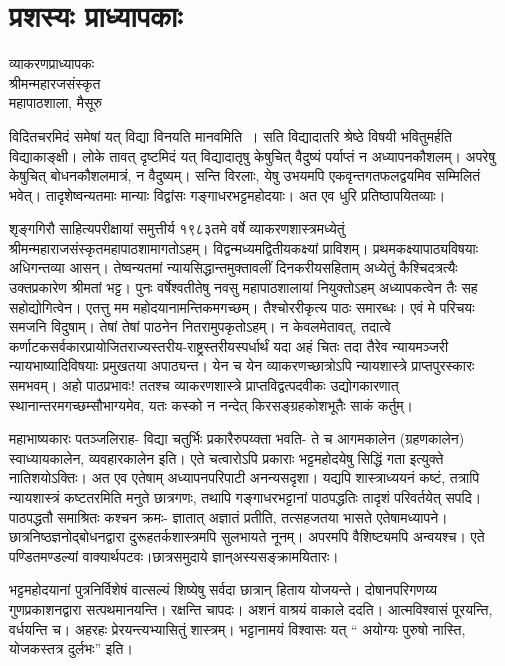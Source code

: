 \chapter{प्रशस्यः प्राध्यापकाः}

\begin{center}
\smallskip
व्याकरणप्राध्यापकः\\
श्रीमन्महारजसंस्कृत\\
महापाठशाला, मैसूरु
\addrule
\end{center}
विदितचरमिदं समेषां यत् विद्या विनयति मानवमिति~। सति विद्यादातरि श्रेष्ठे विषयी भवितुमर्हति विद्याकाङ्क्षी।  लोके तावत् दृष्टमिदं यत् विद्यादातृषु केषुचित् वैदुष्यं पर्याप्तं न अध्यापनकौशलम्। अपरेषु केषुचित् बोधनकौशलमात्रं, न वैदुष्यम्। सन्ति विरलाः, येषु उभयमपि एकवृन्तगतफलद्वयमिव सम्मिलितं भवेत्। तादृशेष्वन्यतमाः मान्याः विद्वांसः गङ्गाधरभट्टमहोदयाः। अत एव धुरि प्रतिष्ठापयितव्याः।

शृङ्गगिरौ साहित्यपरीक्षायां समुत्तीर्य १९८३तमे वर्षे व्याकरणशास्त्रमध्येतुं श्रीमन्महाराजसंस्कृतमहापाठशामागतोऽहम्। विद्वन्मध्यमद्वितीयकक्ष्यां प्राविशम्। प्रथमकक्ष्यापाठ्यविषयाः अधिगन्तव्या आसन्। तेष्वन्यतमां न्यायसिद्धान्तमुक्तावलीं दिनकरीयसहिताम् अध्येतुं कैश्चिदत्रत्यैः उक्तप्रकारेण श्रीमतां भट्ट। पुनः वर्षेश्वतीतेषु नवसु महापाठशालायां नियुक्तोऽहम् अध्यापकत्वेन तैः सह सहोद्योगित्वेन। एतत्तु मम महोदयानामन्तिकमगच्छम्। तैश्चोररीकृत्य पाठः समारब्धः। एवं मे परिचयः समजनि विदुषाम्। तेषां तेषां पाठनेन नितरामुपकृतोऽहम्। न केवलमेतावत्, तदात्वे कर्णाटकसर्वकारप्रायोजितराज्यस्तरीय-राष्ट्रस्तरीयस्पर्धार्थं यदा अहं चितः तदा तैरेव न्यायमञ्जरी न्यायभाष्यादिविषयाः प्रमुखतया अपाठ्यन्त। येन च येन व्याकरणच्छात्रोऽपि न्यायशास्त्रे प्राप्तपुरस्कारः समभवम्। अहो पाठप्रभावः! ततश्च व्याकरणशास्त्रे प्राप्तविद्वत्पदवीकः उद्योगकारणात् स्थानान्तरमगच्छम्सौभाग्यमेव, यतः कस्को न नन्देत् किरसङ्ग्रहकोशभूतैः साकं कर्तुम्।

महाभाष्यकारः पतञ्जलिराह- विद्या चतुर्भिः प्रकारैरुपय्क्ता भवति- ते च आगमकालेन (ग्रहणकालेन) स्वाध्यायकालेन, व्यवहारकालेन इति। एते चत्वारोऽपि प्रकाराः भट्टमहोदयेषु सिद्धिं गता इत्युक्ते नातिशयोऽक्तिः। अत एव एतेषाम् अध्यापनपरिपाटी अनन्यसदृशा। यद्यपि शास्त्राध्ययनं कष्टं, तत्रापि न्यायशास्त्रं कष्टतरमिति मनुते छात्रगणः, तथापि गङ्गाधरभट्टानां पाठपद्धतिः तादृशं परिवर्तयेत् सपदि। पाठपद्धतौ समाश्रितः कश्चन क्रमः- ज्ञातात् अज्ञातं प्रतीति, तत्सहजतया भासते एतेषामध्यापने। छात्रनिष्ठज्ञनोद्बोधनद्वारा दुरूहतर्कशास्त्रमपि सुलभायते नूनम्। अपरमपि वैशिष्ट्यमपि अन्वयश्च। एते पण्डितमण्डल्यां वाक्यार्थपटवः।छात्रसमुदाये ज्ञान्अस्यसङ्क्रामयितारः। 

भट्टमहोदयानां पुत्रनिर्विशेषं वात्सल्यं शिष्येषु सर्वदा छात्रान् हिताय योजयन्ते। दोषानपरिगणय्य गुणप्रकाशनद्वारा सत्पथमानयन्ति। रक्षन्ति चापदः। अशनं वाश्रयं वाकाले ददति। आत्मविश्वासं पूरयन्ति, वर्धयन्ति च। अहरहः प्रेरयन्त्यभ्यासितुं शास्त्रम्। भट्टानामयं विश्वासः यत् “ अयोग्यः पुरुषो नास्ति, योजकस्तत्र दुर्लभः” इति। 


